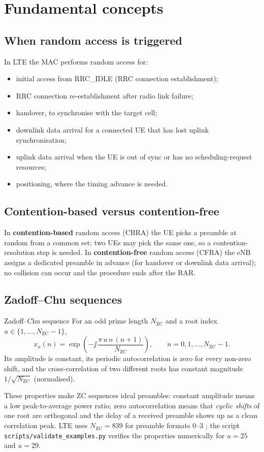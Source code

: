 \documentclass[11pt,a4paper]{article}
\begin{document}
\section{Fundamental concepts}

\subsection{When random access is triggered}
In LTE the MAC performs random access \cite{ts36321} for:
\begin{itemize}
  \item initial access from RRC\_IDLE (RRC connection establishment);
  \item RRC connection re-establishment after radio link failure;
  \item handover, to synchronise with the target cell;
  \item downlink data arrival for a connected UE that has lost uplink synchronisation;
  \item uplink data arrival when the UE is out of sync or has no scheduling-request resources;
  \item positioning, where the timing advance is needed.
\end{itemize}

\subsection{Contention-based versus contention-free}
In \textbf{contention-based} random access (CBRA) the UE picks a preamble at random from a common set;
two UEs may pick the same one, so a contention-resolution step is needed. In \textbf{contention-free}
random access (CFRA) the eNB assigns a dedicated preamble in advance (for handover or downlink data
arrival); no collision can occur and the procedure ends after the RAR.

\subsection{Zadoff--Chu sequences}
\begin{definitionbox}{Zadoff--Chu sequence}
For an odd prime length $N_{\mathrm{ZC}}$ and a root index $u\in\{1,\dots,N_{\mathrm{ZC}}-1\}$,
\begin{equation}\label{eq:zc}
  x_u(n) = \exp\!\left(-\jj\,\frac{\pi\,u\,n\,(n+1)}{N_{\mathrm{ZC}}}\right), \qquad n = 0,1,\dots,N_{\mathrm{ZC}}-1 .
\end{equation}
Its amplitude is constant, its periodic autocorrelation is zero for every non-zero shift, and the
cross-correlation of two different roots has constant magnitude $1/\sqrt{N_{\mathrm{ZC}}}$ (normalised).
\end{definitionbox}
These properties make ZC sequences ideal preambles: constant amplitude means a low peak-to-average
power ratio; zero autocorrelation means that \emph{cyclic shifts} of one root are orthogonal and the
delay of a received preamble shows up as a clean correlation peak. LTE uses $N_{\mathrm{ZC}} = 839$ for
preamble formats 0--3 \cite{ts36211}; the script \texttt{scripts/validate\_examples.py} verifies the
properties numerically for $u=25$ and $u=29$.
\end{document}
